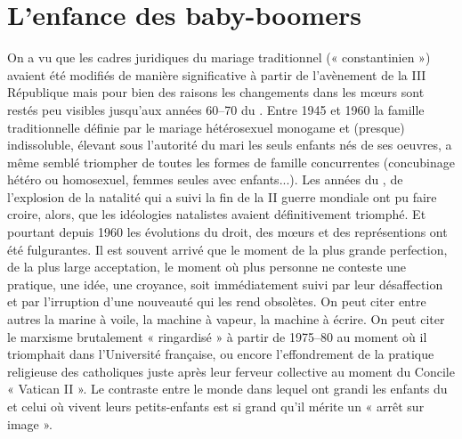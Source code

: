 

 
 \chapter{L'enfance des baby-boomers}
 
  On a vu que les cadres juridiques du mariage traditionnel (« constantinien ») avaient été modifiés de manière significative à partir de l'avènement de la III\ieme{} République mais pour bien des raisons les changements dans les mœurs sont restés peu visibles jusqu'aux années 60--70 du . Entre 1945 et 1960 la famille traditionnelle définie par le mariage hétérosexuel monogame et (presque) indissoluble, élevant sous l'autorité du mari les seuls enfants nés de ses oeuvres, a même semblé triompher  de toutes les formes de famille concurrentes (concubinage hétéro ou homosexuel, femmes seules avec enfants...). Les années du , de l'explosion de la natalité qui a suivi la fin de la II\ieme{} guerre mondiale ont pu faire croire, alors, que les idéologies natalistes avaient définitivement triomphé. Et pourtant depuis 1960 les évolutions du droit, des mœurs et des représentions ont été fulgurantes. Il est souvent arrivé que le moment de la plus grande perfection, de la plus large acceptation, le moment où plus personne ne conteste une pratique, une idée, une croyance, soit immédiatement suivi par leur désaffection et par l'irruption d'une nouveauté qui les rend obsolètes. On peut citer entre autres la marine à voile, la machine à vapeur, la machine à écrire. On peut citer le marxisme brutalement « ringardisé » à partir de 1975--80 au moment où il triomphait dans l'Université française, ou encore l'effondrement de la pratique religieuse des catholiques juste après leur ferveur collective au moment du Concile « Vatican II ». Le contraste entre  le monde dans lequel ont grandi les enfants du  et celui où vivent leurs petits-enfants est si grand qu'il mérite un « arrêt sur image ». 
  
